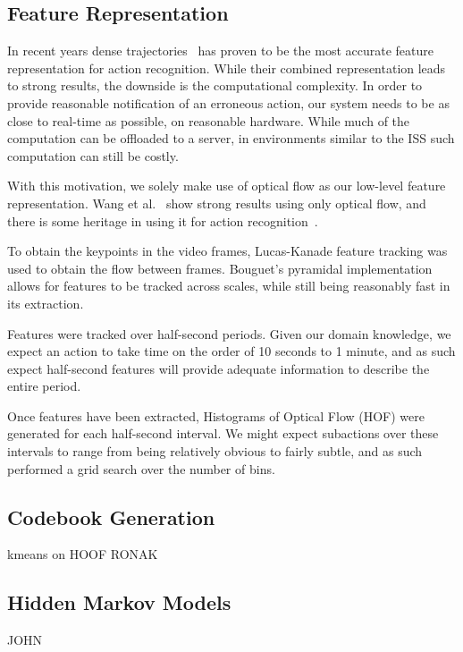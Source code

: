 \documentclass[10pt,twocolumn,letterpaper]{article}
\begin{document}
\subsection{Feature Representation}
In recent years dense trajectories~\cite{wang2011action} has proven to be the most accurate feature representation for action recognition. While their combined representation leads to strong results, the downside is the computational complexity. In order to provide reasonable notification of an erroneous action, our system needs to be as close to real-time as possible, on reasonable hardware. While much of the computation can be offloaded to a server, in environments similar to the ISS such computation can still be costly.

With this motivation, we solely make use of optical flow as our low-level feature representation. Wang et al.~\cite{wang2011action} show strong results using only optical flow, and there is some heritage in using it for action recognition~\cite{chaudhry2009histograms}.

To obtain the keypoints in the video frames, Lucas-Kanade feature tracking was used to obtain the flow between frames. Bouguet's pyramidal implementation~\cite{bouguet2001pyramidal} allows for features to be tracked across scales, while still being reasonably fast in its extraction.

Features were tracked over half-second periods. Given our domain knowledge, we expect an action to take time on the order of 10 seconds to 1 minute, and as such expect half-second features will provide adequate information to describe the entire period.

Once features have been extracted, Histograms of Optical Flow (HOF) were generated for each half-second interval. We might expect subactions over these intervals to range from being relatively obvious to fairly subtle, and as such performed a grid search over the number of bins.

\subsection{Codebook Generation}
kmeans on HOOF
RONAK

\subsection{Hidden Markov Models}
JOHN

\end{document}
